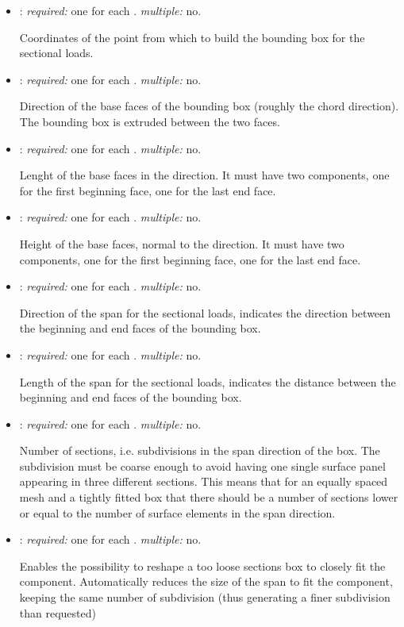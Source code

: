 \begin{itemize}
\item {}: \textit{required:} one for each . \textit{multiple:} no.

Coordinates of the point from which to build the bounding box for the sectional loads.

\item {}: \textit{required:} one for each . \textit{multiple:} no.

Direction of the base faces of the bounding box (roughly the chord direction). The bounding box is extruded between the two faces. 

\item {}: \textit{required:} one for each . \textit{multiple:} no.

Lenght of the base faces in the  direction. It must have two components, one for the first beginning face, one for the last end face. 

\item {}: \textit{required:} one for each . \textit{multiple:} no.

Height of the base faces, normal to the  direction. It must have two components, one for the first beginning face, one for the last end face. 

\item {}: \textit{required:} one for each . \textit{multiple:} no.

Direction of the span for the sectional loads, indicates the direction between the beginning and end faces of the bounding box.

\item {}: \textit{required:} one for each . \textit{multiple:} no.

Length of the span for the sectional loads, indicates the distance between the beginning and end faces of the bounding box.

\item {}: \textit{required:} one for each . \textit{multiple:} no.

Number of sections, i.e. subdivisions in the span direction of the box. The subdivision must be coarse enough to avoid having one single surface panel appearing in three different sections. This means that for an equally spaced mesh and a tightly fitted box that there should be a number of sections lower or equal to the number of surface elements in the span direction. 

\item {}: \textit{required:} one for each . \textit{multiple:} no.

Enables the possibility to reshape a too loose sections box to closely fit the component. Automatically reduces the size of the span to fit the component, keeping the same number of subdivision (thus generating a finer subdivision than requested)

\end{itemize}


